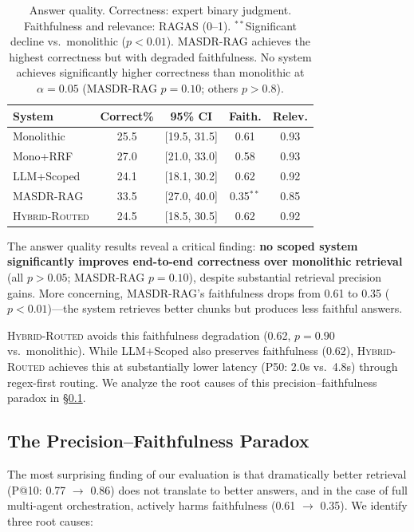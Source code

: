 \documentclass{article}
\newcommand{\systemname}{\textsc{MASDR-RAG}}
\newcommand{\hybridname}{\textsc{Hybrid-Routed}}
\newcommand{\sig}{$^{**}$}
\begin{document}
\begin{table}[H]
\centering
\footnotesize
\begin{tabular}{l c c c c}
\toprule
\textbf{System} & \textbf{Correct\%} & \textbf{95\% CI} & \textbf{Faith.} & \textbf{Relev.} \\
\midrule
Monolithic      & 25.5 & [19.5, 31.5] & 0.61 & 0.93 \\
Mono+RRF        & 27.0 & [21.0, 33.0] & 0.58 & 0.93 \\
LLM+Scoped      & 24.1 & [18.1, 30.2] & 0.62 & 0.92 \\
\systemname{}   & 33.5 & [27.0, 40.0] & 0.35\sig & 0.85 \\
\hybridname{}   & 24.5 & [18.5, 30.5] & 0.62 & 0.92 \\
\bottomrule
\end{tabular}
\caption{Answer quality. Correctness: expert binary judgment. Faithfulness and relevance: RAGAS (0--1). \sig{}Significant decline vs.\ monolithic ($p<0.01$). \systemname{} achieves the highest correctness but with degraded faithfulness. No system achieves significantly higher correctness than monolithic at $\alpha=0.05$ (\systemname{} $p=0.10$; others $p>0.8$).}
\label{tab:answer_quality}
\end{table}

The answer quality results reveal a critical finding: \textbf{no scoped system significantly improves end-to-end correctness over monolithic retrieval} (all $p > 0.05$; \systemname{} $p = 0.10$), despite substantial retrieval precision gains. More concerning, \systemname{}'s faithfulness drops from 0.61 to 0.35 ($p < 0.01$)---the system retrieves better chunks but produces less faithful answers.

\hybridname{} avoids this faithfulness degradation (0.62, $p = 0.90$ vs.\ monolithic). While LLM+Scoped also preserves faithfulness (0.62), \hybridname{} achieves this at substantially lower latency (P50: 2.0s vs.\ 4.8s) through regex-first routing. We analyze the root causes of this precision--faithfulness paradox in \S\ref{sec:paradox}.

\subsection{The Precision--Faithfulness Paradox}
\label{sec:paradox}

The most surprising finding of our evaluation is that dramatically better retrieval (P@10: 0.77 $\rightarrow$ 0.86) does not translate to better answers, and in the case of full multi-agent orchestration, actively harms faithfulness (0.61 $\rightarrow$ 0.35). We identify three root causes:
\end{document}
